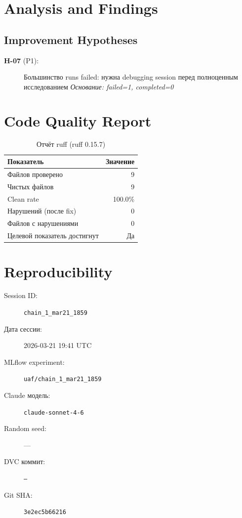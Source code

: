 \documentclass[10pt,a4paper,twocolumn]{article}
\begin{document}
\section{Analysis and Findings}





\subsection{Improvement Hypotheses}

\begin{description}
    \item[\textbf{H-07} (P1):] Большинство runs failed: нужна debugging session перед полноценным исследованием
    \textit{Основание: failed=1, completed=0}
\end{description}




\section{Code Quality Report}

\begin{table}[H]
\centering
\caption{Отчёт ruff (ruff 0.15.7)}
\begin{tabular}{lr}
\toprule
Показатель & Значение \\
\midrule
Файлов проверено & 9 \\
Чистых файлов & 9 \\
Clean rate & \textcolor{passcolor}{100.0\%} \\
Нарушений (после fix) & \textcolor{passcolor}{0} \\
Файлов с нарушениями & 0 \\
Целевой показатель достигнут & \textcolor{passcolor}{Да} \\
\bottomrule
\end{tabular}
\end{table}





\section{Reproducibility}

\begin{description}
    \item[Session ID:] \texttt{chain\_1\_mar21\_1859}
    \item[Дата сессии:] 2026-03-21 19:41 UTC
    \item[MLflow experiment:] \texttt{uaf/chain\_1\_mar21\_1859}
    \item[Claude модель:] \texttt{claude-sonnet-4-6}
    \item[Random seed:] ---
    \item[DVC коммит:] \texttt{---}
    \item[Git SHA:] \texttt{3e2ec5b66216}
\end{description}
\end{document}
